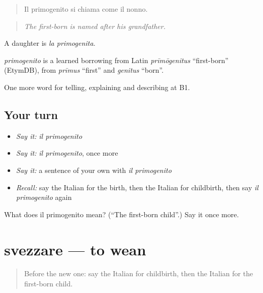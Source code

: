 \begin{quote}
Il primogenito si chiama come il nonno.
\end{quote}

\begin{quote}
\emph{The first-born is named after his grandfather.}
\end{quote}

A daughter is \emph{la primogenita}.

\begin{cousinweb}
\emph{primogenito} is a learned borrowing from Latin \emph{prīmōgenitus} \textquotedblleft{}first-born\textquotedblright{} (EtymDB), from \emph{prīmus} \textquotedblleft{}first\textquotedblright{} and \emph{genitus} \textquotedblleft{}born\textquotedblright{}.
\end{cousinweb}

\begin{grammarlens}[title={What you've built}]
One more word for telling, explaining and describing at B1.
\end{grammarlens}

\subsection*{Your turn}
\begin{itemize}
\raggedright
  \item \emph{Say it:} \emph{il primogenito}
  \item \emph{Say it:} \emph{il primogenito}, once more
  \item \emph{Say it:} a sentence of your own with \emph{il primogenito}
  \item \emph{Recall:} say the Italian for the birth, then the Italian for childbirth, then say \emph{il primogenito} again
\end{itemize}

\begin{tcolorbox}[breakable,colback=teal!4,colframe=teal!35!black,title={Before you move on}]
What does il primogenito mean? (\textquotedblleft{}The first-born child\textquotedblright{}.) Say it once more.
\end{tcolorbox}
\section[svezzare]{svezzare — to wean}

\label{lesson:IT-C307-svezzare}



\begin{quote}
Before the new one: say the Italian for childbirth, then the Italian for the first-born child.
\end{quote}

